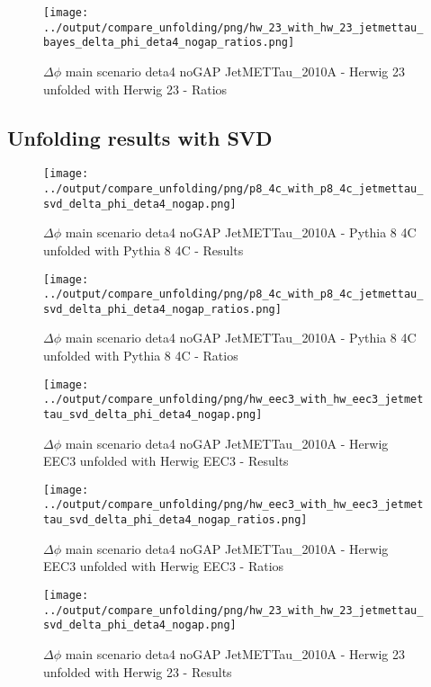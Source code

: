 \documentclass[11pt]{book}
\begin{document}
\begin{figure}[ht]
\centering
\texttt{[image: ../output/compare\_unfolding/png/hw\_23\_with\_hw\_23\_jetmettau\_bayes\_delta\_phi\_deta4\_nogap\_ratios.png]}
\caption{$\Delta\phi$ main scenario deta4 noGAP JetMETTau\_2010A - Herwig 23 unfolded with Herwig 23 - Ratios}
\label{hw_23_hw_23_jetmettau_bayes_delta_phi_deta4_nogap_b}
\end{figure}

\clearpage
\subsection{Unfolding results with SVD}

\begin{figure}[ht]
\centering
\texttt{[image: ../output/compare\_unfolding/png/p8\_4c\_with\_p8\_4c\_jetmettau\_svd\_delta\_phi\_deta4\_nogap.png]}
\caption{$\Delta\phi$ main scenario deta4 noGAP JetMETTau\_2010A - Pythia 8 4C unfolded with Pythia 8 4C - Results}
\label{p8_p8_jetmettau_svd_delta_phi_deta4_nogap_a}
\end{figure}

\begin{figure}[ht]
\centering
\texttt{[image: ../output/compare\_unfolding/png/p8\_4c\_with\_p8\_4c\_jetmettau\_svd\_delta\_phi\_deta4\_nogap\_ratios.png]}
\caption{$\Delta\phi$ main scenario deta4 noGAP JetMETTau\_2010A - Pythia 8 4C unfolded with Pythia 8 4C - Ratios}
\label{p8_p8_jetmettau_svd_delta_phi_deta4_nogap_b}
\end{figure}

\begin{figure}[ht]
\centering
\texttt{[image: ../output/compare\_unfolding/png/hw\_eec3\_with\_hw\_eec3\_jetmettau\_svd\_delta\_phi\_deta4\_nogap.png]}
\caption{$\Delta\phi$ main scenario deta4 noGAP JetMETTau\_2010A - Herwig EEC3 unfolded with Herwig EEC3 - Results}
\label{hw_eec3_hw_eec3_jetmettau_svd_delta_phi_deta4_nogap_a}
\end{figure}

\begin{figure}[ht]
\centering
\texttt{[image: ../output/compare\_unfolding/png/hw\_eec3\_with\_hw\_eec3\_jetmettau\_svd\_delta\_phi\_deta4\_nogap\_ratios.png]}
\caption{$\Delta\phi$ main scenario deta4 noGAP JetMETTau\_2010A - Herwig EEC3 unfolded with Herwig EEC3 - Ratios}
\label{hw_eec3_hw_eec3_jetmettau_svd_delta_phi_deta4_nogap_b}
\end{figure}

\begin{figure}[ht]
\centering
\texttt{[image: ../output/compare\_unfolding/png/hw\_23\_with\_hw\_23\_jetmettau\_svd\_delta\_phi\_deta4\_nogap.png]}
\caption{$\Delta\phi$ main scenario deta4 noGAP JetMETTau\_2010A - Herwig 23 unfolded with Herwig 23 - Results}
\label{hw_23_hw_23_jetmettau_svd_delta_phi_deta4_nogap_a}
\end{figure}
\end{document}
